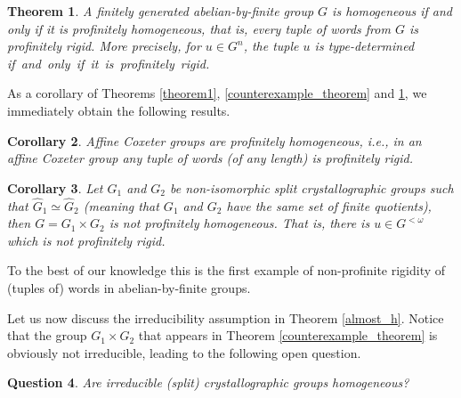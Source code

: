 \documentclass[a4paper, 11pt]{amsart}
\newtheorem{te}{Theorem}[section]
\newtheorem{co}[te]{Corollary}
\newtheorem{qu}[te]{Question}
\theoremstyle{definition}
\theoremstyle{remark}
\begin{document}
\begin{te}\label{prof_homogeneity} A finitely generated abelian-by-finite group $G$ is homogeneous if and only if it is profinitely homogeneous, that is, every tuple of words from $G$ is profinitely rigid. More precisely, for $u \in G^n$, the tuple $u$ is type-determined \mbox{if and only if it is profinitely rigid.}
\end{te}	

As a corollary of Theorems \ref{theorem1}, \ref{counterexample_theorem} and \ref{prof_homogeneity}, we immediately obtain the following results.

\begin{co}
Affine Coxeter groups are profinitely homogeneous, i.e., in an affine Coxeter group any tuple of words (of any length) is profinitely rigid. 
\end{co}

\begin{co}Let $G_1$ and $G_2$ be non-isomorphic split crystallographic groups such that $\widehat{G}_1\simeq \widehat{G}_2$ (meaning that $G_1$ and $G_2$ have the same set of finite quotients), then $G =G_1 \times G_2$ is not profinitely homogeneous. That is, there is $u \in G^{< \omega}$ which is not profinitely rigid.
\end{co}

To the best of our knowledge this is the first example of non-profinite rigidity of (tuples of) words in abelian-by-finite groups.


	

Let us now discuss the irreducibility assumption in Theorem \ref{almost_h}. Notice that the group $G_1\times G_2$ that appears in Theorem \ref{counterexample_theorem} is obviously not irreducible, leading to the following open question.

\begin{qu} Are irreducible (split) crystallographic groups homogeneous?
\end{qu}
\end{document}
